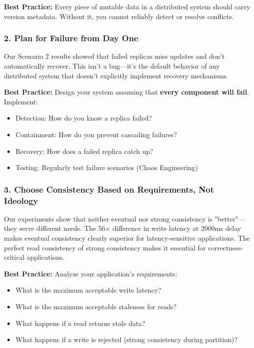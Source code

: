 \documentclass[10pt,a4paper]{article}
\begin{document}
\textbf{Best Practice:} Every piece of mutable data in a distributed system should carry version metadata. Without it, you cannot reliably detect or resolve conflicts.

\subsubsection{2. Plan for Failure from Day One}

Our Scenario 2 results showed that failed replicas miss updates and don't automatically recover. This isn't a bug---it's the default behavior of any distributed system that doesn't explicitly implement recovery mechanisms.

\textbf{Best Practice:} Design your system assuming that \textbf{every component will fail}. Implement:
\begin{itemize}
    \item Detection: How do you know a replica failed?
    \item Containment: How do you prevent cascading failures?
    \item Recovery: How does a failed replica catch up?
    \item Testing: Regularly test failure scenarios (Chaos Engineering)
\end{itemize}

\subsubsection{3. Choose Consistency Based on Requirements, Not Ideology}

Our experiments show that neither eventual nor strong consistency is "better"---they serve different needs. The 56× difference in write latency at 2000ms delay makes eventual consistency clearly superior for latency-sensitive applications. The perfect read consistency of strong consistency makes it essential for correctness-critical applications.

\textbf{Best Practice:} Analyze your application's requirements:
\begin{itemize}
    \item What is the maximum acceptable write latency?
    \item What is the maximum acceptable staleness for reads?
    \item What happens if a read returns stale data?
    \item What happens if a write is rejected (strong consistency during partition)?
\end{itemize}
\end{document}
